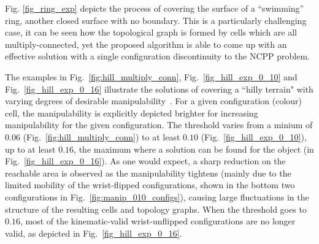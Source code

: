 \documentclass[conference]{IEEEtran}
\begin{document}
Fig. \ref{fig_ring_exp} depicts the process of covering the surface of a ``swimming'' ring, another closed surface with no boundary. 
This is a particularly challenging case, it can be seen how the topological graph is formed by cells which are all multiply-connected, 
yet the proposed algorithm is able to come up with an effective solution with a single configuration discontinuity to the NCPP problem. 

The examples in Fig.~\ref{fig:hill_multiply_conn}, Fig.~\ref{fig_hill_exp_0_10} and Fig.~\ref{fig_hill_exp_0_16} illustrate the solutions of covering a ``hilly terrain" with varying degrees of desirable manipulability~\cite{yoshikawa1990translational}. 
For a given configuration (colour) cell, the manipulability is explicitly depicted brighter for increasing manipulability for the given configuration. The threshold  varies from a minium of $0.06$ (Fig.~\ref{fig:hill_multiply_conn}) to at least $0.10$ (Fig.~\ref{fig_hill_exp_0_10}), up to at least $0.16$, the maximum where a solution can be found for the object (in Fig.~\ref{fig_hill_exp_0_16}).
As one would expect, a sharp reduction on the reachable area is observed as the manipulability tightens 
(mainly due to the limited mobility of the wrist-flipped configurations, shown in the bottom two configurations 
in Fig.~\ref{fig:manip_010_configs}), causing large fluctuations in the structure of the resulting cells and topology graphs. When the threshold goes to $0.16$, most of the kinematic-valid wrist-unflipped configurations are no longer valid, as depicted in Fig.~\ref{fig_hill_exp_0_16}. %
\end{document}

